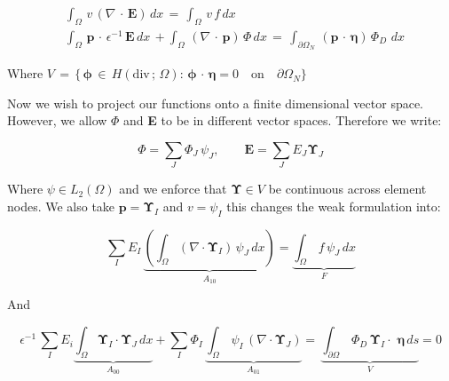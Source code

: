 \documentclass[10pt]{report}
\numberwithin{equation}{section}
\begin{document}
\begin{align}
&\int_{\Omega} \, v  \, \left( \nabla  \, \cdot \, \textbf{E} \right) \, dx \, =  \, \int_{\Omega} \, v  \, f \, dx  \\
&\int_{\Omega} \, \textbf{p} \, \cdot \, \epsilon^{-1} \, \textbf{E} \, dx \, 
+ \int_{\Omega} \, \left(\nabla \, \cdot \, \textbf{p} \right)\, \Phi \, dx 
\, = \, 
\int_{\partial \Omega_{N}} \, \left( \textbf{p} \, \cdot \, \boldsymbol \eta \right) \, \Phi_{D} \,  \, dx  \, 
\end{align}


\vspace{2mm}


\noindent
Where $V  \, = \,  \{ \, \boldsymbol \phi \, \in \, H(\text{div}\,; \, \Omega) : \, \boldsymbol \phi \, \cdot \, \boldsymbol \eta = 0 \quad \text{on} \quad \partial \Omega_{N} \} $


\vspace{2mm}


\noindent
Now we wish to project our functions onto a finite dimensional vector space.  However, we allow $\Phi$ and \textbf{E} to be in different vector spaces. Therefore we write:

\vspace{2mm}


$$ \Phi = \sum_{J} \Phi_{J} \, \psi_{J} ,  \qquad \textbf{E} = \sum_{J} E_{J} \boldsymbol \Upsilon_{J} $$


\vspace{2mm}


\noindent
Where $\psi \in L_{2}(\Omega)$ and we enforce that $\boldsymbol \Upsilon \in V$ be continuous across element nodes.  We also take $\textbf{p} = \boldsymbol \Upsilon_{I}$ and $v = \psi_{I}$ this changes the weak formulation into:


$$ \sum_{I} E_{I} \, \underbrace{\left( \int_{\Omega} (\nabla \cdot \boldsymbol \Upsilon_{I}) \,
 \psi_{J} \, dx \right)}_{A_{10}} = 
\underbrace{\int_{\Omega} \,f \, \psi_{J} \, dx}_{F}$$


\noindent
And

$$  \epsilon^{-1} \, \sum_{I} E_{i }\underbrace{\int_{\Omega} \boldsymbol \Upsilon_{I} \cdot \boldsymbol \Upsilon_{J} \, dx}_{A_{00}}
+\sum_{I} \Phi_{I} \,  \underbrace{\int_{\Omega} \, \psi _{I}
\, \left( \nabla \cdot \boldsymbol \Upsilon_{J} \right)}_{A_{01}}
=  \, \underbrace{\int_{\partial \Omega} \, \Phi_{D} \, \boldsymbol \Upsilon_{I}
\cdot \, \boldsymbol \, \boldsymbol \eta \, ds}_{V} = 0
$$

\vspace{2mm}
\end{document}
